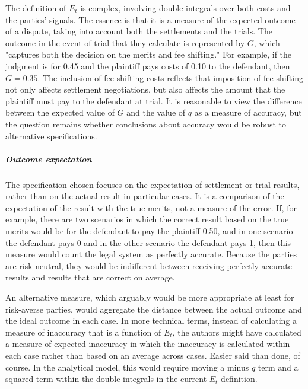\documentclass{article}
\begin{document}
The definition of $E_t$ is complex, involving double integrals over both costs and the parties' signals. The essence is that it is a measure of the expected outcome of a dispute, taking into account both the settlements and the trials. The outcome in the event of trial that they calculate is represented by $G$, which "captures both the decision on the merits and fee shifting." For example, if the judgment is for 0.45 and the plaintiff pays costs of 0.10 to the defendant, then $G=0.35$. The inclusion of fee shifting costs reflects that imposition of fee shifting not only affects settlement negotiations, but also affects the amount that the plaintiff must pay to the defendant at trial. It is reasonable to view the difference between the expected value of $G$ and the value of $q$ as a measure of accuracy, but the question remains whether conclusions about accuracy would be robust to alternative specifications.

\subparagraph{Outcome expectation}The specification chosen focuses on the expectation of settlement or trial results, rather than on the actual result in particular cases. It is a comparison of the expectation of the result with the true merits, not a measure of the error. If, for example, there are two scenarios in which the correct result based on the true merits would be for the defendant to pay the plaintiff 0.50, and in one scenario the defendant pays 0 and in the other scenario the defendant pays 1, then this measure would count the legal system as perfectly accurate. Because the parties are risk-neutral, they would be indifferent between receiving perfectly accurate results and results that are correct on average. 

An alternative measure, which arguably would be more appropriate at least for risk-averse parties, would aggregate the distance between the actual outcome and the ideal outcome in each case. In more technical terms, instead of calculating a measure of inaccuracy that is a function of $E_t$, the authors might have calculated a measure of expected inaccuracy in which the inaccuracy is calculated within each case rather than based on an average across cases. Easier said than done, of course. In the analytical model, this would require moving a minus $q$ term and a squared term within the double integrals in the current $E_t$ definition. 
\end{document}
